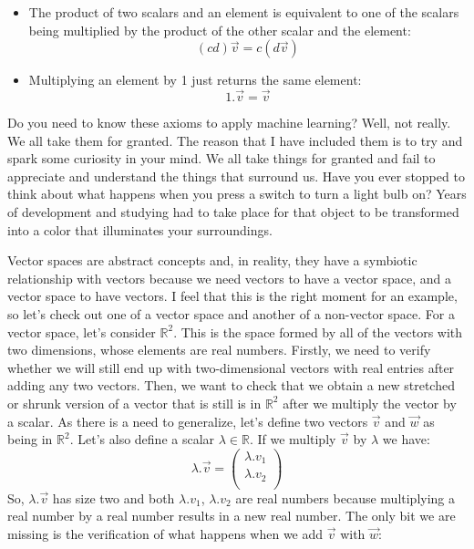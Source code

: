 \documentclass[600paper, 11pt,twoside,openany]{kdp}
\begin{document}
\begin{tcolorbox}
\begin{itemize}
\item The product of two scalars and an element is equivalent to one of the scalars being multiplied by the product of the other scalar and the element:
\[(cd)\overrightarrow{v} = c(d\overrightarrow{v})\]
\item Multiplying an element by 1 just returns the same element:
\[1.\overrightarrow{v} = \overrightarrow{v} \] 
\end{itemize}
\end{tcolorbox}
\vspace{8pt}
\indent Do you need to know these axioms to apply machine learning? Well, not really. We all take them for granted. The reason that I have included them is to try and spark some curiosity in your mind. We all take things for granted and fail to appreciate and understand the things that surround us. Have you ever stopped to think about what happens when you press a switch to turn a light bulb on? Years of development and studying had to take place for that object to be transformed into a color that illuminates your surroundings.
\par 
\vspace{-3pt}
\indent Vector spaces are abstract concepts and, in reality, they have a symbiotic relationship with vectors because we need vectors to have a vector space, and a vector space to have vectors. I feel that this is the right moment for an example, so let’s check out one of a vector space and another of a non-vector space. For a vector space, let’s consider $\mathbb{R}^2$. This is the space formed by all of the vectors with two dimensions, whose elements are real numbers. Firstly, we need to verify whether we will still end up with two-dimensional vectors with real entries after adding any two vectors. Then, we want to check that we obtain a new stretched or shrunk version of a vector that is still is in $\mathbb{R}^2$ after we multiply the vector by a scalar. As there is a need to generalize, let’s define two vectors  $\overrightarrow{v}$ and $\overrightarrow{w}$ as being in $\mathbb{R}^2$. Let’s also define a scalar $\lambda \in \mathbb{R}$. If we multiply  $\overrightarrow{v}$ by $\lambda$ we have:
\[\lambda.\overrightarrow{v}  = \begin{pmatrix}
 \lambda.v_1\\
 \lambda.v_2\\
\end{pmatrix}
\]
\indent 
So, $\lambda.\overrightarrow{v}$ has size two and both $\lambda.v_1$, $\lambda.v_2$ are real numbers because multiplying a real number by a real number results in a new real number. The only bit we are missing is the verification of what happens when we add $\overrightarrow{v}$ with $\overrightarrow{w}$:
\end{document}
